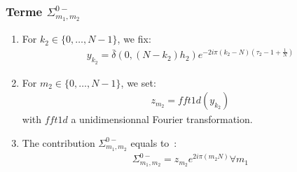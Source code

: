 \subsubsection{Terme $\Sigma_{m_1,m_2}^{0-}$}
\begin{enumerate}
\item For $k_2\in\{0,\hdots,N-1\}$, we fix:
\begin{align*}
y_{k_2}= \bar{\delta}(0,(N-k_2)h_2)e^{-2i\pi (k_2-N)\left(\tau_2-1+\frac{1}{N}\right)}
\end{align*}
\item For $m_2\in\{0,\hdots,N-1\}$, we set:
\begin{align*}
  z_{m_2}=fft1d(y_{k_2})
\end{align*}
with $fft1d$ a unidimensionnal Fourier transformation.
\item The contribution $\Sigma_{m_1,m_2}^{0-}$ equals to~:
\begin{align*}
  \Sigma_{m_1,m_2}^{0-}=z_{m_2}e^{2i\pi\left(m_2 N\right)} \forall m_1
\end{align*}
\end{enumerate}
